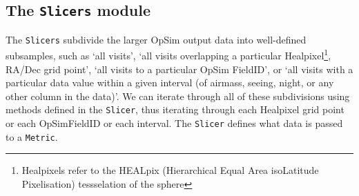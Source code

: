 \documentclass[]{spie}  %
\begin{document}
\subsection{The {\tt Slicers} module}

The {\tt Slicers} subdivide the larger OpSim output data into well-defined subsamples, such as `all
visits', `all visits overlapping a particular
Healpixel\footnote{Healpixels refer to the HEALpix (Hierarchical Equal
  Area isoLatitude Pixelisation) tessselation of the
  sphere\cite{healpix}}, RA/Dec grid
point', `all visits to a particular OpSim FieldID', or `all visits
with a particular data value within a given interval (of airmass, seeing, night, or any other
column in the data)'. We can iterate through all of these subdivisions
using methods defined in the {\tt Slicer}, thus iterating through each
Healpixel grid point or each OpSimFieldID or each interval. The
{\tt Slicer} defines what data is passed to a {\tt Metric}. 
\end{document}
